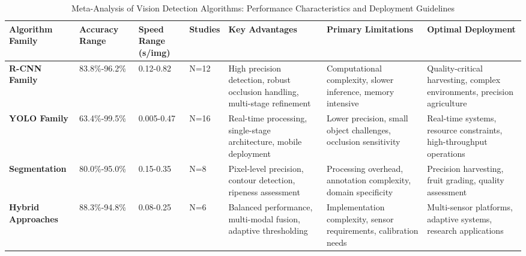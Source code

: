 \begin{table*}[htbp]
\centering
\footnotesize
\caption{Meta-Analysis of Vision Detection Algorithms: Performance Characteristics and Deployment Guidelines}
\label{tab:vision_meta_analysis}
\begin{tabular}{@{}p{}p{}p{}p{}p{}p{}p{}@{}}
\toprule
\textbf{Algorithm Family} & \textbf{Accuracy Range} & \textbf{Speed Range (s/img)} & \textbf{Studies} & \textbf{Key Advantages} & \textbf{Primary Limitations} & \textbf{Optimal Deployment} \\
\midrule

\textbf{R-CNN Family} & 
83.8\%-96.2\% & 
0.12-0.82 & 
N=12 & 
High precision detection, robust occlusion handling, multi-stage refinement \cite{sa2016deepfruits,wan2020faster,yu2019fruit} & 
Computational complexity, slower inference, memory intensive \cite{fu2020faster,mu2020intact} & 
Quality-critical harvesting, complex environments, precision agriculture \\
\midrule

\textbf{YOLO Family} & 
63.4\%-99.5\% & 
0.005-0.47 & 
N=16 & 
Real-time processing, single-stage architecture, mobile deployment \cite{liu2020yolo,lawal2021tomato,li2021real} & 
Lower precision, small object challenges, occlusion sensitivity \cite{magalhaes2021evaluating,sozzi2022automatic} & 
Real-time systems, resource constraints, high-throughput operations \\
\midrule

\textbf{Segmentation} & 
80.0\%-95.0\% & 
0.15-0.35 & 
N=8 & 
Pixel-level precision, contour detection, ripeness assessment \cite{barth2018data,kang2019fruit,li2020detection} & 
Processing overhead, annotation complexity, domain specificity \cite{majeed2020deep,luo2018vision} & 
Precision harvesting, fruit grading, quality assessment \\
\midrule

\textbf{Hybrid Approaches} & 
88.3\%-94.8\% & 
0.08-0.25 & 
N=6 & 
Balanced performance, multi-modal fusion, adaptive thresholding \cite{gene2019multi,kirk2020b,feng2018} & 
Implementation complexity, sensor requirements, calibration needs \cite{lin2020color,rahnemoonfar2017deep} & 
Multi-sensor platforms, adaptive systems, research applications \\

\bottomrule
\end{tabular}
\end{table*}